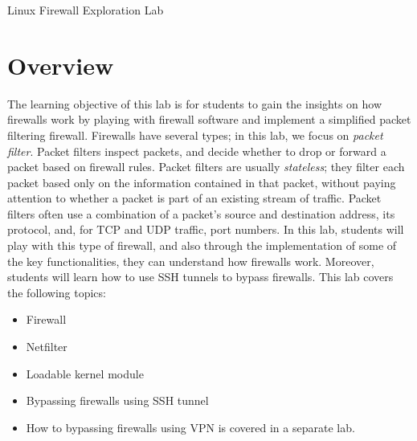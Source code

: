 



\newcommand{\telnet} {\texttt{telnet}\xspace}

\newcommand{\firewallFigs}{./Figs}





\begin{center}
{\LARGE Linux Firewall Exploration Lab}
\end{center}




\section{Overview}

The learning objective of this lab is for students to gain the 
insights on how firewalls work 
by playing with firewall software and implement a simplified 
packet filtering firewall.
Firewalls have several types; in this lab, we focus on
\textit{packet filter}.
Packet filters inspect packets, and decide 
whether to drop or forward a packet based on firewall rules. 
Packet filters are usually {\em stateless}; they filter each packet based 
only on the information contained in that packet, without paying 
attention to whether a packet is part of an existing stream of traffic.
Packet filters often use a combination of a packet's source and 
destination address, its protocol, and, for TCP and UDP traffic, 
port numbers. 
In this lab, students will play with 
this type of firewall, and also through the implementation of some 
of the key functionalities, they can understand how 
firewalls work. Moreover, students will learn how to use SSH tunnels to bypass firewalls. 
This lab covers the following topics:

\begin{itemize}[noitemsep]
\item Firewall
\item Netfilter
\item Loadable kernel module
\item Bypassing firewalls using SSH tunnel 
\item How to bypassing firewalls using VPN is covered in a separate lab.
\end{itemize}


